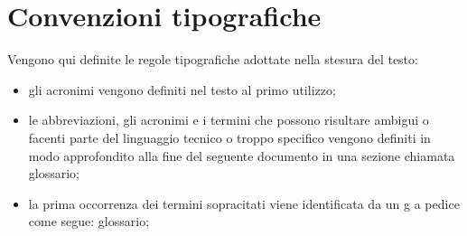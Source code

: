 
\cleardoublepage
{}
{}
\begingroup
\let\clearpage\relax
\let\cleardoublepage\relax
\let\cleardoublepage\relax

\chapter*{Convenzioni tipografiche}

Vengono qui definite le regole tipografiche adottate nella stesura del testo:

\begin{itemize}
    \item gli acronimi vengono definiti nel testo al primo utilizzo;

	\item le abbreviazioni, gli acronimi e i termini che possono risultare ambigui o facenti parte del linguaggio tecnico o troppo specifico vengono definiti in modo approfondito alla fine del seguente documento in una sezione chiamata glossario;
	
	\item la prima occorrenza dei termini sopracitati viene identificata da un g a pedice come segue: glossario\glo;
	
\end{itemize}

%
%

\endgroup			

\vfill